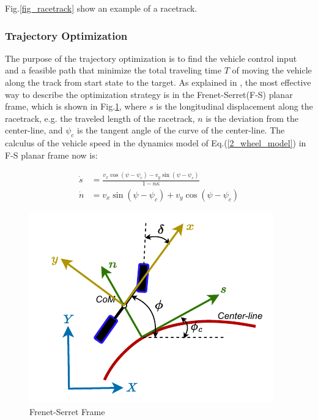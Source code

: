 \documentclass[conference, onecolumn]{IEEEtran}
\begin{document}
Fig.\ref{fig_racetrack} show an example of a racetrack.

\subsubsection[optimization]{Trajectory Optimization}\label{trajectoryoptimization}
The purpose of the trajectory optimization is to find the vehicle control input and a feasible path that minimize the total traveling time $T$ of moving the vehicle along the track from start state to the target. As explained in \cite{LOT20147559}, the most effective way to describe the optimization strategy is in the Frenet-Serret(F-S) planar frame, which is shown in Fig.\ref{fig_sn}, where $s$ is the longitudinal displacement along the racetrack, e.g. the traveled length of the racetrack, $n$ is the deviation from the center-line, and $\psi_c$ is the tangent angle of the curve of the center-line. The calculus of the vehicle speed in the dynamics model of Eq.(\ref{2_wheel_model}) in F-S planar frame now is:

\begin{subequations}\label{dynamics_fs}
	\begin{align}
		\dot{s}  & = \frac{v_x \cos(\psi-\psi_c)-v_y \sin(\psi-\psi_c)}{1-n\kappa}
		\label{s_dot}	\\ 
		\dot{n} & = v_x \sin(\psi-\psi_c)+v_y \cos(\psi-\psi_c) 
	\end{align}
\end{subequations}

\begin{figure}[h]
	\centering
	\captionsetup{justification=centering}
	\includegraphics{sn.pdf}
	\caption{Frenet-Serret Frame}
	\label{fig_sn}
\end{figure}
\end{document}
